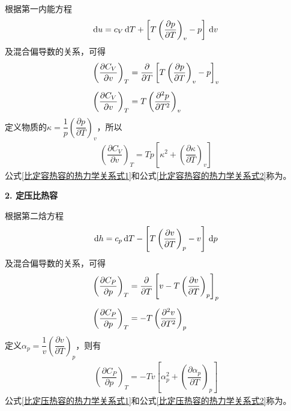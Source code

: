根据第一内能方程
\begin{align*}
	{\rm{d}} u = c_V \,{\rm{d}} T + \left[T \left(\dfrac{\partial p}{\partial T}\right)_v - p \right]\,{\rm{d}} v
\end{align*}
及混合偏导数的关系，可得
\begin{align}
	\left(\dfrac{\partial C_V}{\partial v}\right)_T &= \dfrac{\partial }{\partial T}\left[T \left(\dfrac{\partial p}{\partial T}\right)_v - p\right]_v\notag \\[0.5em]
	\left(\dfrac{\partial C_V}{\partial v}\right)_T &= T \left(\dfrac{\partial^2 p}{\partial T^2}\right)_v
	\label{比定容热容的热力学关系式1}
\end{align}
定义物质的$\displaystyle \kappa = \dfrac{1}{p} \left(\dfrac{\partial p}{\partial T}\right)_v$，所以
\begin{align}
	\left(\dfrac{\partial C_V}{\partial v}\right)_T = Tp\left[\kappa^2 + \left(\dfrac{\partial \kappa}{\partial T}\right)_v\right]
	\label{比定容热容的热力学关系式2}
\end{align}
公式\eqref{比定容热容的热力学关系式1}和公式\eqref{比定容热容的热力学关系式2}称为。
\vspace*{0.5em}

\noindent \textbf{2. 定压比热容}

根据第二焓方程
\begin{align*}
	{\rm{d}} h =c_p \, {\rm{d}} T - \left[T \left(\dfrac{\partial v}{\partial T}\right)_p - v\right]\, {\rm{d}} p
\end{align*}
及混合偏导数的关系，可得
\begin{align}
	\left(\dfrac{\partial C_P}{\partial p}\right)_T &= \dfrac{\partial }{\partial T}\left[v - T \left(\dfrac{\partial v}{\partial T}\right)_p\right]_p \notag\\[0.5em]
	\left(\dfrac{\partial C_P}{\partial p}\right)_T &= - T \left(\dfrac{\partial^2 v}{\partial T^2}\right)_p
	\label{比定压热容的热力学关系式1}
\end{align}
定义$\alpha_p = \dfrac{1}{v} \left(\dfrac{\partial v}{\partial T}\right)_p$，则有
\begin{align}
	\left(\dfrac{\partial C_P}{\partial p}\right)_T = - Tv\left[\alpha_p^2 + \left(\dfrac{\partial \alpha_p}{\partial T}\right)_p\right]
	\label{比定压热容的热力学关系式2}
\end{align}
公式\eqref{比定压热容的热力学关系式1}和公式\eqref{比定压热容的热力学关系式2}称为。
\vspace*{0.5em}

